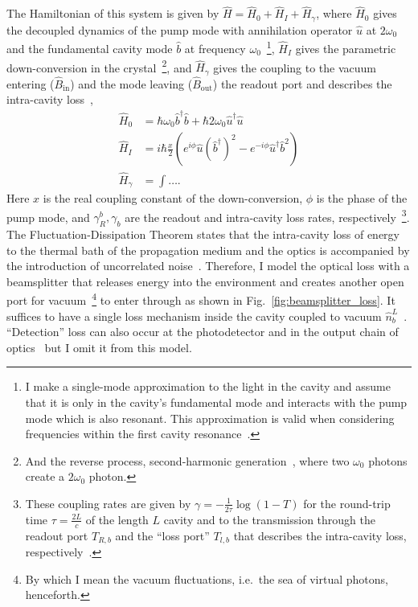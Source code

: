 The Hamiltonian of this system is given by $\hat H = \hat H_0 + \hat H_I + \hat H_\gamma$, where $\hat H_0$ gives the decoupled dynamics of the pump mode with annihilation operator $\hat u$ at $2\omega_0$ and the fundamental cavity mode $\hat b$ at frequency $\omega_0$~\footnote{I make a single-mode approximation to the light in the cavity and assume that it is only in the cavity's fundamental mode and interacts with the pump mode which is also resonant. This approximation is valid when considering frequencies within the first cavity resonance~\cite{}.}, $\hat H_I$ gives the parametric down-conversion in the crystal~\footnote{And the reverse process, second-harmonic generation~\cite{}, where two $\omega_0$ photons create a $2\omega_0$ photon.}, and $\hat H_\gamma$ gives the coupling to the vacuum entering ($\hat B_\text{in}$) and the mode leaving ($\hat B_\text{out}$) the readout port and describes the intra-cavity loss~\cite{}, 
\begin{align}
\hat H_0 &= \hbar \omega_0 \hat b^\dag \hat b + \hbar 2 \omega_0 \hat u^\dag \hat u\\
\hat H_I &= i \hbar \frac{x}{2} (e^{i\phi} \hat u (\hat b^\dag)^2 - e^{-i\phi} \hat u^\dag \hat b^2)\\
\hat H_\gamma &= \int \ldots .
\end{align}
Here $x$ is the real coupling constant of the down-conversion, $\phi$ is the phase of the pump mode, and $\gamma^b_R,\gamma_b$ are the readout and intra-cavity loss rates, respectively~\footnote{These coupling rates are given by $\gamma = -\frac{1}{2\tau}\log(1-T)$ for the round-trip time $\tau = \frac{2L}{c}$ of the length $L$ cavity and to the transmission through the readout port $T_{R,b}$ and the ``loss port'' $T_{l,b}$ that describes the intra-cavity loss, respectively~\cite{}.}. %
The Fluctuation-Dissipation Theorem states that the intra-cavity loss of energy to the thermal bath of the propagation medium and the optics is accompanied by the introduction of uncorrelated noise~\cite{}. Therefore, I model the optical loss with a beamsplitter that releases energy into the environment and creates another open port for vacuum~\footnote{By which I mean the vacuum fluctuations, i.e.\ the sea of virtual photons, henceforth. } to enter through as shown in Fig.~\ref{fig:beamsplitter_loss}. It suffices to have a single loss mechanism inside the cavity coupled to vacuum $\hat n^L_b$~\cite{}. ``Detection'' loss can also occur at the photodetector and in the output chain of optics~\cite{} but I omit it from this model.

